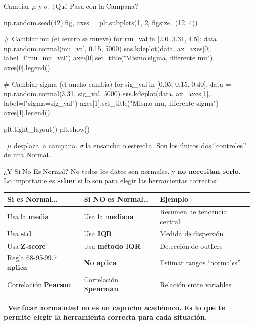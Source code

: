 \documentclass[aspectratio=169, 11pt]{beamer}
\begin{document}
\begin{frame}[fragile,shrink=28]{Cambiar $\mu$ y $\sigma$: ¿Qué Pasa con la Campana?}
  \vspace{-6pt}
  \begin{pyblock}
np.random.seed(42)
fig, axes = plt.subplots(1, 2, figsize=(12, 4))

# Cambiar mu (el centro se mueve)
for mu_val in [2.0, 3.31, 4.5]:
    data = np.random.normal(mu_val, 0.15, 5000)
    sns.kdeplot(data, ax=axes[0], label=f"mu={mu_val}")
axes[0].set_title("Mismo sigma, diferente mu")
axes[0].legend()

# Cambiar sigma (el ancho cambia)
for sig_val in [0.05, 0.15, 0.40]:
    data = np.random.normal(3.31, sig_val, 5000)
    sns.kdeplot(data, ax=axes[1], label=f"sigma={sig_val}")
axes[1].set_title("Mismo mu, diferente sigma")
axes[1].legend()

plt.tight_layout()
plt.show()
  \end{pyblock}

  \vspace{4pt}
  {\scriptsize\color{textMuted}
    \faLightbulb\ $\mu$ desplaza la campana. $\sigma$ la ensancha o estrecha.
    Son los únicos dos ``controles'' de una Normal.}
\end{frame}

\begin{frame}[shrink=5]{¿Y Si No Es Normal?}
  \vspace{-4pt}
  {\footnotesize
    No todos los datos son normales, y \textbf{no necesitan serlo}.
    Lo importante es \textbf{saber} si lo son para elegir las herramientas correctas:}

  \vspace{6pt}
  {\small
  \renewcommand{\arraystretch}{1.3}
  \begin{tabular}{@{}p{4cm}p{4cm}p{4cm}@{}}
    \toprule
    \textbf{Si es Normal\ldots} & \textbf{Si NO es Normal\ldots} & \textbf{Ejemplo} \\
    \midrule
    Usa la \textbf{media} &
      Usa la \textbf{mediana} &
      Resumen de tendencia central \\
    Usa \textbf{std} &
      Usa \textbf{IQR} &
      Medida de dispersión \\
    Usa \textbf{Z-score} &
      Usa \textbf{método IQR} &
      Detección de outliers \\
    Regla 68-95-99.7 \textbf{aplica} &
      \textbf{No aplica} &
      Estimar rangos ``normales'' \\
    Correlación \textbf{Pearson} &
      Correlación \textbf{Spearman} &
      Relación entre variables \\
    \bottomrule
  \end{tabular}
  }

  \vspace{6pt}
  {\scriptsize\color{arcaDark}\bfseries
    \faArrowRight\ Verificar normalidad no es un capricho académico.
    Es lo que te permite \textbf{elegir la herramienta correcta} para cada situación.}
\end{frame}
\end{document}
